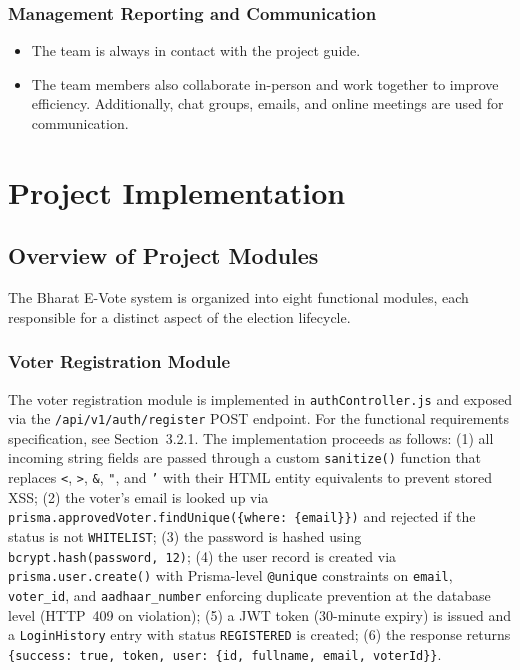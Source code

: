 \documentclass[oneside,a4paper,12pt]{book}
\begin{document}
\subsection{Management Reporting and Communication}
\begin{itemize}[leftmargin=1.5cm]
    \item The team is always in contact with the project guide.
    \item The team members also collaborate in-person and work together to improve efficiency. Additionally, chat groups, emails, and online meetings are used for communication.
\end{itemize}

\chapter{Project Implementation}

\section{Overview of Project Modules}
The Bharat E-Vote system is organized into eight functional modules, each responsible for a distinct aspect of the election lifecycle.

\subsection{Voter Registration Module}
The voter registration module is implemented in \texttt{authController.js} and exposed via the \texttt{/api/v1/auth/register} POST endpoint. For the functional requirements specification, see Section~3.2.1. The implementation proceeds as follows: (1) all incoming string fields are passed through a custom \texttt{sanitize()} function that replaces \texttt{<}, \texttt{>}, \texttt{\&}, \texttt{"}, and \texttt{'} with their HTML entity equivalents to prevent stored XSS; (2) the voter's email is looked up via \texttt{prisma.approvedVoter.findUnique(\{where: \{email\}\})} and rejected if the status is not \texttt{WHITELIST}; (3) the password is hashed using \texttt{bcrypt.hash(password, 12)}; (4) the user record is created via \texttt{prisma.user.create()} with Prisma-level \texttt{@unique} constraints on \texttt{email}, \texttt{voter\_id}, and \texttt{aadhaar\_number} enforcing duplicate prevention at the database level (HTTP~409 on violation); (5) a JWT token (30-minute expiry) is issued and a \texttt{LoginHistory} entry with status \texttt{REGISTERED} is created; (6) the response returns \texttt{\{success: true, token, user: \{id, fullname, email, voterId\}\}}.
\end{document}
